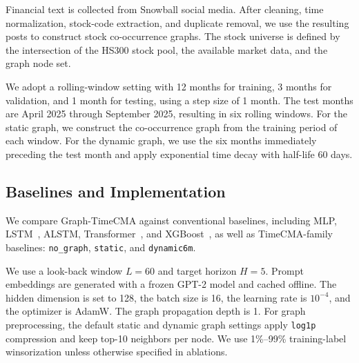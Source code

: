 \documentclass[runningheads]{llncs}
\begin{document}
Financial text is collected from Snowball social media. After cleaning, time normalization, stock-code extraction, and duplicate removal, we use the resulting posts to construct stock co-occurrence graphs. The stock universe is defined by the intersection of the HS300 stock pool, the available market data, and the graph node set.

We adopt a rolling-window setting with 12 months for training, 3 months for validation, and 1 month for testing, using a step size of 1 month. The test months are April 2025 through September 2025, resulting in six rolling windows. For the static graph, we construct the co-occurrence graph from the training period of each window. For the dynamic graph, we use the six months immediately preceding the test month and apply exponential time decay with half-life 60 days.

\subsection{Baselines and Implementation}

We compare Graph-TimeCMA against conventional baselines, including MLP, LSTM~\cite{hochreiter1997long}, ALSTM, Transformer~\cite{vaswani2017attention}, and XGBoost~\cite{chen2016xgboost}, as well as TimeCMA-family baselines: \texttt{no\_graph}, \texttt{static}, and \texttt{dynamic6m}.

We use a look-back window $L = 60$ and target horizon $H = 5$. Prompt embeddings are generated with a frozen GPT-2 model and cached offline. The hidden dimension is set to 128, the batch size is 16, the learning rate is $10^{-4}$, and the optimizer is AdamW. The graph propagation depth is 1. For graph preprocessing, the default static and dynamic graph settings apply \texttt{log1p} compression and keep top-10 neighbors per node. We use 1\%--99\% training-label winsorization unless otherwise specified in ablations.
\end{document}
